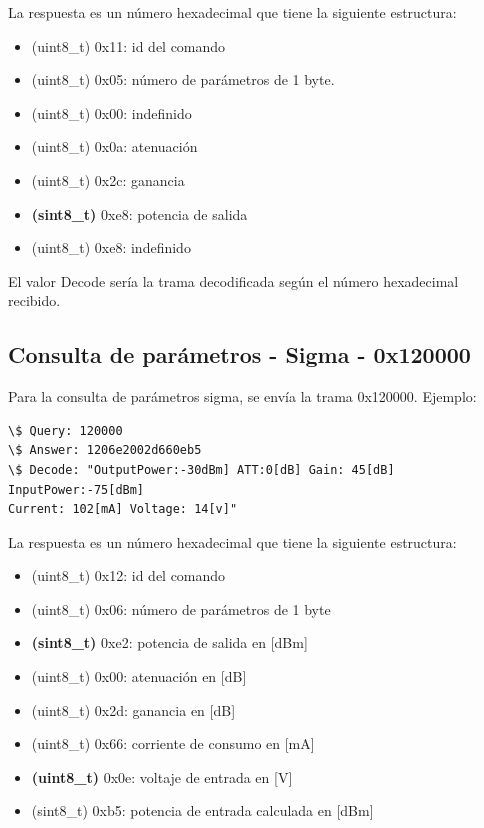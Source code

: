 \documentclass[12pt,twoside,onecolumn]{article}
\begin{document}
La respuesta es un número hexadecimal que tiene la siguiente estructura:
\begin{itemize}
\setlength\itemsep{-0.1em}
    \item (uint8\_t) 0x11: id del comando
    \item (uint8\_t) 0x05: número de parámetros de 1 byte.
    \item (uint8\_t) 0x00: indefinido
    \item (uint8\_t) 0x0a: atenuación
    \item (uint8\_t) 0x2c: ganancia
    \item \textbf{(sint8\_t)} 0xe8: potencia de salida 
    \item (uint8\_t) 0xe8: indefinido
\end{itemize}

El valor Decode sería la trama decodificada según el número hexadecimal recibido.

\subsection{Consulta de parámetros - Sigma - 0x120000}\label{sec:sigma-param}
Para la consulta de parámetros sigma, se envía la trama 0x120000. Ejemplo:
\begin{verbatim}
\$ Query: 120000
\$ Answer: 1206e2002d660eb5
\$ Decode: "OutputPower:-30dBm] ATT:0[dB] Gain: 45[dB] InputPower:-75[dBm]
Current: 102[mA] Voltage: 14[v]" 
\end{verbatim}

La respuesta es un número hexadecimal que tiene la siguiente estructura:
\begin{itemize}
\setlength\itemsep{-0.1em}
    \item (uint8\_t) 0x12: id del comando
    \item (uint8\_t) 0x06: número de parámetros de 1 byte
    \item \textbf{(sint8\_t)} 0xe2: potencia de salida en [dBm] 
    \item (uint8\_t) 0x00: atenuación en [dB]
    \item (uint8\_t) 0x2d: ganancia en [dB]
    \item (uint8\_t) 0x66: corriente de consumo en [mA]
    \item \textbf{(uint8\_t)} 0x0e: voltaje de entrada en [V]
    \item (sint8\_t) 0xb5: potencia de entrada calculada en [dBm]
\end{itemize}
\end{document}
